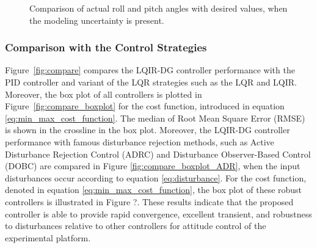 \documentclass[3p]{elsarticle}
\begin{document}
\begin{figure}[H]
    \caption{Comparison of actual roll and pitch angles with desired values, when the modeling uncertainty is present.}
    \label{fig:weight}
\end{figure}
\subsubsection{Comparison with the Control Strategies}
\noindent Figure~\ref{fig:compare} compares the LQIR-DG controller performance with the PID controller and variant of the LQR strategies such as the LQR and LQIR. 
Moreover, the box plot of all controllers is plotted in Figure~\ref{fig:compare_boxplot} for the cost function, introduced in equation \eqref{eq:min_max_cost_function}. %
The median of Root Mean Square Error (RMSE) is shown in the crossline in the box plot.
Moreover, the LQIR-DG controller performance with famous disturbance rejection methods, such as Active Disturbance Rejection Control (ADRC) \cite{CHENG2023} and Disturbance Observer-Based Control (DOBC) \cite{AGHAYAN202320} are compared in Figure \ref{fig:compare_boxplot_ADR}, when the input disturbances occur according to equation \eqref{eq:disturbance}. For the cost function, denoted in equation \eqref{eq:min_max_cost_function}, the box plot of these robust controllers is illustrated in Figure ?. 
These results indicate that the proposed controller is able to provide rapid convergence, excellent transient, and robustness to disturbances relative to other controllers for attitude control of the experimental platform.
\end{document}
